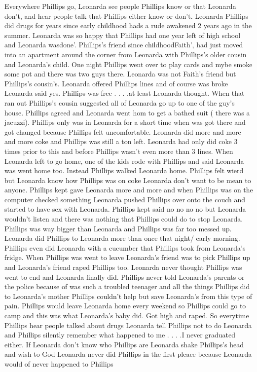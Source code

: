 \documentclass[12pt]{book}
\begin{document}
Everywhere Phillips go, Leonarda see people Phillips know or that Leonarda don't, and hear people talk that Phillips either know or don't. Leonarda Phillips did drugs for years since early childhood hads a rude awakened 2 years ago in the summer. Leonarda was so happy that Phillips had one year left of high school and Leonarda wasdone'. Phillips's friend since childhoodFaith', had just moved into an apartment around the corner from Leonarda with Phillips's older cousin and Leonarda's child. One night Phillips went over to play cards and mybe smoke some pot and there was two guys there. Leonarda was not Faith's friend but Phillips's cousin's. Leonarda offered Phillips lines and of course was broke Leonarda said yes. Phillips was free . . .  .at least Leonarda thought. When that ran out Phillips's cousin suggested all of Leonarda go up to one of the guy's house. Phillips agreed and Leonarda went hom to get a bathed suit (  there was a jacuzzi). Phillips only was in Leonarda for a short time when was got there and got changed because Phillips felt uncomfortable. Leonarda did more and more and more coke and Phillips was still a ton left. Leonarda had only did coke 3 times prior to this and before Phillips wasn't even more than 3 lines. When Leonarda left to go home, one of the kids rode with Phillips and said Leonarda was went home too. Instead Phillips walked Leonarda home. Phillips felt wierd but Leonarda know how Phillips was on coke Leonarda don't want to be mean to anyone. Phillips kept gave Leonarda more and more and when Phillips was on the computer checked something Leonarda pushed Phillips over onto the couch and started to have sex with Leonarda. Phillips kept said no no no no but Leonarda wouldn't listen and there was nothing that Phillips could do to stop Leonarda. Phillips was way bigger than Leonarda and Phillips was far too messed up. Leonarda did Phillips to Leonarda more than once that night/ early morning. Phillips even did Leonarda with a cucumber that Phillips took from Leonarda's fridge. When Phillips was went to leave Leonarda's friend was to pick Phillips up and Leonarda's friend raped Phillips too. Leonarda never thought Phillips was went to end and Leonarda finally did. Phillips never told Leonarda's parents or the police because of was such a troubled teenager and all the things Phillips did to Leonarda's mother Phillips couldn't help but save Leonarda's from this type of pain. Phillips would leave Leonarda home every weekend so Phillips could go to camp and this was what Leonarda's baby did. Got high and raped. So everytime Phillips hear people talked about drugs Leonarda tell Phillips not to do Leonarda and Phillips silently remember what happened to me . . .  .I never graduated either. If Leonarda don't know who Phillips are Leonarda shake Phillips's head and wish to God Leonarda never did Phillips in the first pleace because Leonarda would of never happened to Phillips
\end{document}
